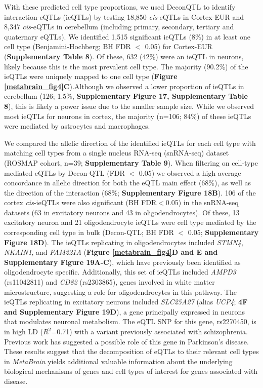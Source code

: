With these predicted cell type proportions, we used DeconQTL\cite{raulaguirregamboaDeconvolutionBulkBlood2020} to identify interaction-eQTLs (ieQTLs) by testing 18,850 \textit{cis}-eQTLs in Cortex-EUR and 8,347 \textit{cis}-eQTLs in cerebellum (including primary, secondary, tertiary and quaternary eQTLs). We identified 1,515 significant ieQTLs (8\%) in at least one cell type (Benjamini-Hochberg; BH FDR $<$ 0.05) for Cortex-EUR (\textbf{Supplementary Table 8}). Of these, 632 (42\%) were an ieQTL in neurons, likely because this is the most prevalent cell type. The majority (90.2\%) of the ieQTLs were uniquely mapped to one cell type (\textbf{Figure \ref{metabrain_fig4}C}).Although we observed a lower proportion of ieQTLs in cerebellum (126; 1.5\%, \textbf{Supplementary Figure 17, Supplementary Table 8}), this is likely a power issue due to the smaller sample size. While we observed most ieQTLs for neurons in cortex, the majority (n=106; 84\%) of these ieQTLs were mediated by astrocytes and macrophages.  

We compared the allelic direction of the identified ieQTLs for each cell type with matching cell types from a single nucleus RNA-seq (snRNA-seq) dataset (ROSMAP cohort, n=39; \textbf{Supplementary Table 9})\cite{mathysSinglecellTranscriptomicAnalysis2019}. When filtering on cell-type mediated eQTLs by Decon-QTL (FDR $<$ 0.05) we observed a high average concordance in allelic direction for both the eQTL main effect (68\%), as well as the direction of the interaction (68\%; \textbf{Supplementary Figure 18B}). 106 of the cortex \textit{cis}-ieQTLs were also significant (BH FDR$<$0.05) in the snRNA-seq datasets (63 in excitatory neurons and 43 in oligodendrocytes). Of these, 13 excitatory neuron and 21 oligodendrocyte ieQTLs were cell type mediated by the corresponding cell type in bulk (Decon-QTL; BH FDR $<$ 0.05; \textbf{Supplementary Figure 18D}). The ieQTLs replicating in oligodendrocytes included \textit{STMN4}, \textit{NKAIN1}, and \textit{FAM221A} (\textbf{Figure \ref{metabrain_fig4}D and E and Supplementary Figure 19A-C}), which have previously been identified as oligodendrocyte specific\cite{ngUsingTranscriptomicHidden2019}. Additionally, this set of ieQTLs included \textit{AMPD3} (rs11042811) and \textit{CD82} (rs2303865), genes involved in white matter microstructure\cite{zhaoLargescaleGWASReveals2019}, suggesting a role for oligodendrocytes in this pathway. The ieQTLs replicating in excitatory neurons included \textit{SLC25A27} (alias \textit{UCP4}; \textbf{4F and Supplementary Figure 19D}), a gene principally expressed in neurons\cite{smorodchenkoComparativeAnalysisUncoupling2009} that modulates neuronal metabolism\cite{liuMitochondrialUCP4Mediates2006}. The eQTL SNP for this gene, rs2270450, is in high LD ($R^2$=0.71) with a variant previously associated with schizophrenia\cite{yasunoSynergisticAssociationMitochondrial2007}. Previous work has suggested a possible role of this gene in Parkinson’s disease\cite{ramsdenHumanNeuronalUncoupling2012,hoMitochondrialNeuronalUncoupling2012}. These results suggest that the decomposition of eQTLs to their relevant cell types in \textit{MetaBrain} yields additional valuable information about the underlying biological mechanisms of genes and cell types of interest for genes associated with disease.

